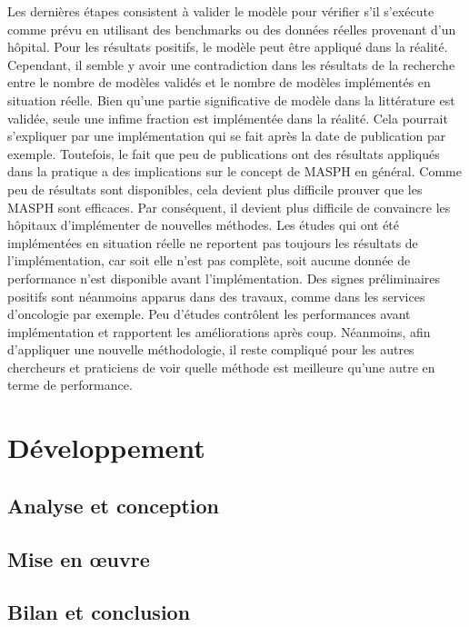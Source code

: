 \documentclass{polytech/polytech}
\begin{document}
Les dernières étapes consistent à valider le modèle pour vérifier s'il s'exécute comme prévu en utilisant des benchmarks ou des données réelles provenant d'un hôpital. Pour les résultats positifs, le modèle peut être appliqué dans la réalité. Cependant, il semble y avoir une contradiction dans les résultats de la recherche entre le nombre de modèles validés et le nombre de modèles implémentés en situation réelle. Bien qu'une partie significative de modèle dans la littérature est validée, seule une infime fraction est implémentée dans la réalité. Cela pourrait s'expliquer par une implémentation qui se fait après la date de publication par exemple. Toutefois, le fait que peu de publications ont des résultats appliqués dans la pratique a des implications sur le concept de MASPH en général. Comme peu de résultats sont disponibles, cela devient plus difficile prouver que les MASPH sont efficaces. Par conséquent, il devient plus difficile de convaincre les hôpitaux d'implémenter de nouvelles méthodes. Les études qui ont été implémentées en situation réelle ne reportent pas toujours les résultats de l'implémentation, car soit elle n'est pas complète, soit aucune donnée de performance n'est disponible avant l'implémentation. Des signes préliminaires positifs sont néanmoins apparus dans des travaux, comme dans les services d'oncologie par exemple. Peu d'études contrôlent les performances avant implémentation et rapportent les améliorations après coup. Néanmoins, afin d'appliquer une nouvelle méthodologie, il reste compliqué pour les autres chercheurs et praticiens de voir quelle méthode est meilleure qu'une autre en terme de performance. 



\part{Développement}


\chapter{Analyse et conception}



\chapter{Mise en œuvre}


\chapter{Bilan et conclusion}
\end{document}
